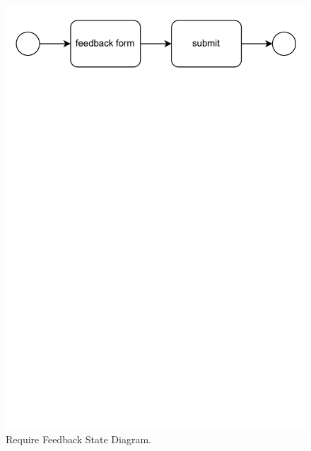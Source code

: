 \begin{figure}[H]
    \begin{center}
        \includegraphics[width=\linewidth]{Images/StateDiagram/RequireFeedback.pdf}
        \caption{Require Feedback State Diagram.}
        \label{fig:req_feedback_state_diag}%
    \end{center}
\end{figure}

\newpage

